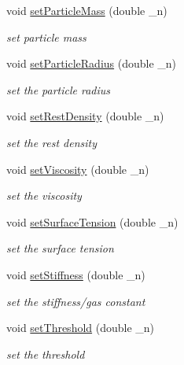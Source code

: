 \begin{DoxyCompactItemize}
void \hyperlink{classGLWindow_ac7b9cdef1ba718032b06f8043f4836d3}{setParticleMass} (double \_\-n)
\begin{DoxyCompactList}\small\item\em set particle mass \item\end{DoxyCompactList}\item 
void \hyperlink{classGLWindow_aeba4b7318975e80b3ed1efb971a91bbb}{setParticleRadius} (double \_\-n)
\begin{DoxyCompactList}\small\item\em set the particle radius \item\end{DoxyCompactList}\item 
void \hyperlink{classGLWindow_a5fe8b8b15ff2eab19739095cbfd53a47}{setRestDensity} (double \_\-n)
\begin{DoxyCompactList}\small\item\em set the rest density \item\end{DoxyCompactList}\item 
void \hyperlink{classGLWindow_ae22720b8f6d1bb25c4ca1dbf09bafc08}{setViscosity} (double \_\-n)
\begin{DoxyCompactList}\small\item\em set the viscosity \item\end{DoxyCompactList}\item 
void \hyperlink{classGLWindow_ab26e262bd95ee756d8261cc092cf8dc3}{setSurfaceTension} (double \_\-n)
\begin{DoxyCompactList}\small\item\em set the surface tension \item\end{DoxyCompactList}\item 
void \hyperlink{classGLWindow_a1720ed224d1b63fe1541c62bc2decc9b}{setStiffness} (double \_\-n)
\begin{DoxyCompactList}\small\item\em set the stiffness/gas constant \item\end{DoxyCompactList}\item 
void \hyperlink{classGLWindow_ac2e41fa3623baddbead609560cf0cb17}{setThreshold} (double \_\-n)
\begin{DoxyCompactList}\small\item\em set the threshold \item\end{DoxyCompactList}\item 

\end{DoxyCompactItemize}
